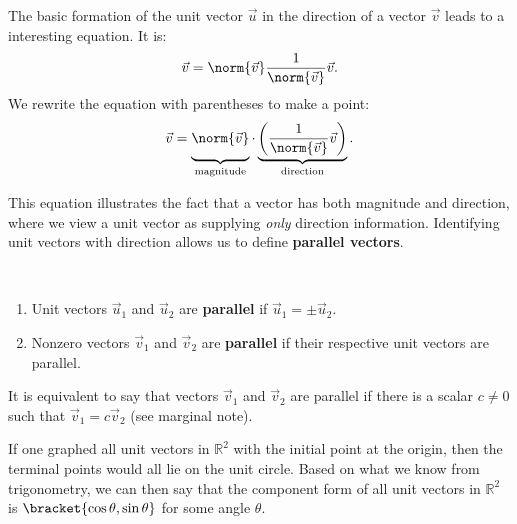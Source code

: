 The basic formation of the unit vector $\vec u$ in the direction of a vector $\vec v$ leads to a interesting equation. It is:
\[\vec v = \norm{\vec v}\frac{1}{\norm{\vec v}}\vec v.\]
We rewrite the equation with parentheses to make a point:
\[
\vec v
=\underbrace{\vphantom{\left(\frac1{\norm{\vec v}}\right)}\norm{\vec v}}_{\text{\scriptsize magnitude}}
\cdot
\underbrace{\left(\frac1{\norm{\vec v}}\vec v\right)}_{\text{\scriptsize direction}}.
\]

This equation illustrates the fact that a vector has both magnitude and direction, where we view a unit vector as supplying \emph{only} direction information. Identifying unit vectors with direction allows us to define \textbf{parallel vectors}.

\begin{definition}\label{def:parallel_vectors}
%
\mbox{}\\[-2\baselineskip]\begin{enumerate}
	\item Unit vectors $\vec u_1$ and $\vec u_2$ are \textbf{parallel} if $\vec u_1 = \pm \vec u_2$.
	\item	Nonzero vectors $\vec v_1$ and $\vec v_2$ are \textbf{parallel} if their respective unit vectors are parallel.
\end{enumerate}
\end{definition}

It is equivalent to say that vectors $\vec v_1$ and $\vec v_2$ are parallel if there is a scalar $c\neq 0$ such that $\vec v_1 = c\vec v_2$ (see marginal note).

If one graphed all unit vectors in $\mathbb{R}^2$ with the initial point at the origin, then the terminal points would all lie on the unit circle. Based on what we know from trigonometry, we can then say that the component form of all unit vectors in $\mathbb{R}^2$ is $\bracket{\cos\theta,\sin\theta}$ for some angle $\theta$.

